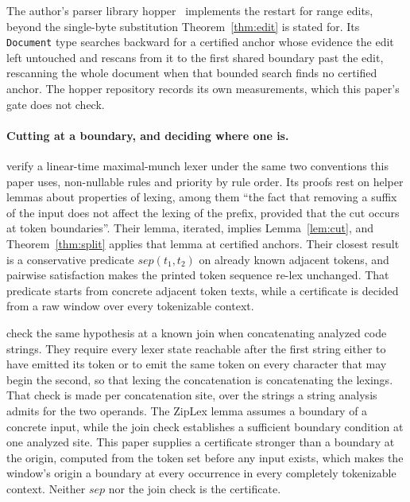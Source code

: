 \documentclass[11pt,a4paper]{article}
\theoremstyle{definition}
\theoremstyle{plain}
\newcommand{\code}[1]{\texttt{#1}}
\begin{document}
The author's parser library hopper~\citep{hopper} implements the restart for range edits, beyond the single-byte
substitution Theorem~\ref{thm:edit} is stated for. Its \code{Document} type searches backward for a certified anchor
whose evidence the edit left untouched and rescans from it to the first shared boundary past the edit, rescanning the
whole document when that bounded search finds no certified anchor. The hopper repository records its own measurements,
which this paper's gate does not check.

\paragraph{Cutting at a boundary, and deciding where one is.} \citet{chassot2026ziplex} verify a linear-time
maximal-munch lexer under the same two conventions this paper uses, non-nullable rules and priority by rule order. Its
proofs rest on helper lemmas about properties of lexing, among them ``the fact that removing a suffix of the input does
not affect the lexing of the prefix, provided that the cut occurs at token boundaries''. Their lemma, iterated, implies
Lemma~\ref{lem:cut}, and Theorem~\ref{thm:split} applies that lemma at certified anchors. Their closest result is a
conservative predicate $\mathit{sep}(t_1, t_2)$ on already known adjacent tokens, and pairwise satisfaction makes the
printed token sequence re-lex unchanged. That predicate starts from concrete adjacent token texts, while a certificate
is decided from a raw window over every tokenizable context.

\citet{lester2016flow} check the same hypothesis at a known join when concatenating analyzed code strings. They require
every lexer state reachable after the first string either to have emitted its token or to emit the same token on every
character that may begin the second, so that lexing the concatenation is concatenating the lexings. That check is made
per concatenation site, over the strings a string analysis admits for the two operands. The ZipLex lemma assumes a
boundary of a concrete input, while the join check establishes a sufficient boundary condition at one analyzed site.
This paper supplies a certificate stronger than a boundary at the origin, computed from the token set before any input
exists, which makes the window's origin a boundary at every occurrence in every completely tokenizable context. Neither
$\mathit{sep}$ nor the join check is the certificate.
\end{document}
